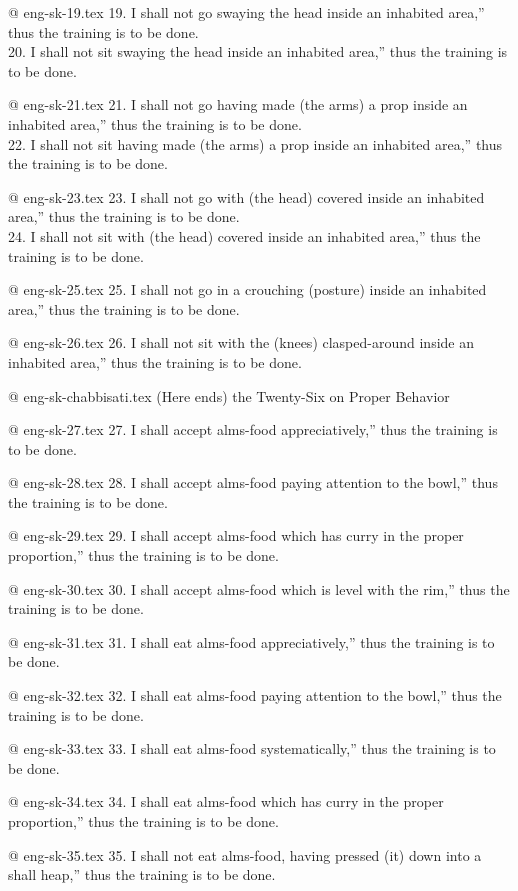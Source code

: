 @ eng-sk-19.tex
19. I shall not go swaying the head inside an inhabited area,” thus the training is to be done.\\
20. I shall not sit swaying the head inside an inhabited area,” thus the training is to be done.

@ eng-sk-21.tex
21. I shall not go having made (the arms) a prop inside an inhabited area,” thus the training is to be done.\\
22. I shall not sit having made (the arms) a prop inside an inhabited area,” thus the training is to be done.

@ eng-sk-23.tex
23. I shall not go with (the head) covered inside an inhabited area,” thus the training is to be done.\\
24. I shall not sit with (the head) covered inside an inhabited area,” thus the training is to be done.

@ eng-sk-25.tex
25. I shall not go in a crouching (posture) inside an inhabited area,” thus the training is to be done.

@ eng-sk-26.tex
26. I shall not sit with the (knees) clasped-around inside an inhabited area,” thus the training is to be done.

@ eng-sk-chabbisati.tex
(Here ends) the Twenty-Six on Proper Behavior

@ eng-sk-27.tex
27. I shall accept alms-food appreciatively,” thus the training is to be done.

@ eng-sk-28.tex
28. I shall accept alms-food paying attention to the bowl,” thus the training is to be done.

@ eng-sk-29.tex
29. I shall accept alms-food which has curry in the proper proportion,” thus the training is to be done.

@ eng-sk-30.tex
30. I shall accept alms-food which is level with the rim,” thus the training is to be done.

@ eng-sk-31.tex
31. I shall eat alms-food appreciatively,” thus the training is to be done.

@ eng-sk-32.tex
32. I shall eat alms-food paying attention to the bowl,” thus the training is to be done.

@ eng-sk-33.tex
33. I shall eat alms-food systematically,” thus the training is to be done.

@ eng-sk-34.tex
34. I shall eat alms-food which has curry in the proper proportion,” thus the training is to be done.

@ eng-sk-35.tex
35. I shall not eat alms-food, having pressed (it) down into a shall heap,” thus the training is to be done.

